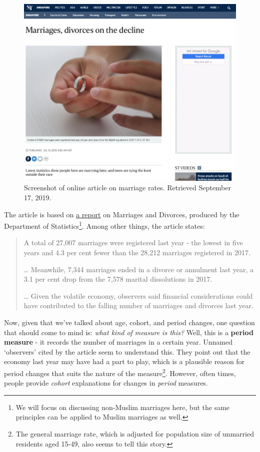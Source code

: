 \documentclass[openany]{book}
\let\rmarkdownfootnote\footnote%
\def\footnote{\protect\rmarkdownfootnote}
\begin{document}
\begin{figure}

{\centering \includegraphics[width=0.8\linewidth]{images/apc/apc_marriage} 

}

\caption{Screenshot of online article on marriage rates. Retrieved September 17, 2019.}\label{fig:st-apcmarriage}
\end{figure}

The article is based on
\href{https://www.singstat.gov.sg/-/media/files/publications/population/smd2018.pdf}{a
report} on Marriages and Divorces, produced by the Department of
Statistics\footnote{We will focus on discussing non-Muslim marriages
  here, but the same principles can be applied to Muslim marriages as
  well.}. Among other things, the article states:

\begin{quote}
A total of 27,007 marriages were registered last year - the lowest in
five years and 4.3 per cent fewer than the 28,212 marriages registered
in 2017.

\ldots{} Meanwhile, 7,344 marriages ended in a divorce or annulment last
year, a 3.1 per cent drop from the 7,578 marital dissolutions in 2017.

\ldots{} Given the volatile economy, observers said financial
considerations could have contributed to the falling number of marriages
and divorces last year.
\end{quote}

Now, given that we've talked about age, cohort, and period changes, one
question that should come to mind is: \emph{what kind of measure is
this?} Well, this is a \textbf{period measure} - it records the number
of marriages in a certain year. Unnamed `observers' cited by the article
seem to understand this. They point out that the economy last year may
have had a part to play, which is a plausible reason for period changes
that suits the nature of the measure\footnote{The general marriage rate,
  which is adjusted for population size of unmarried residents aged
  15-49, also seems to tell this story.}. However, often times, people
provide \emph{cohort} explanations for changes in \emph{period}
measures.
\end{document}

